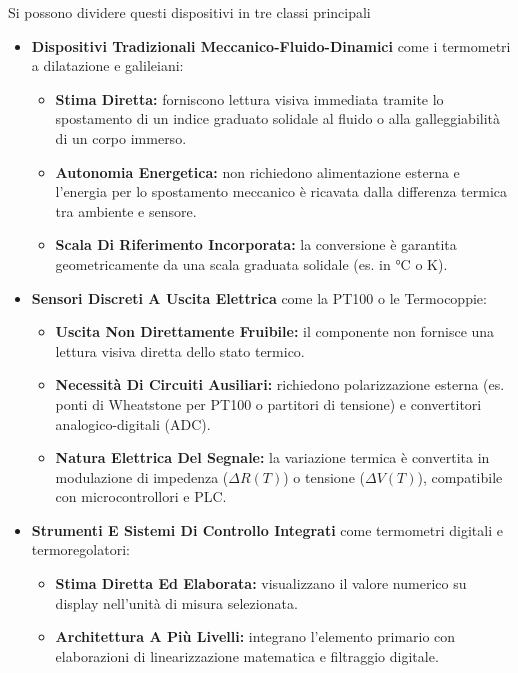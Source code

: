 ﻿\documentclass[11pt, a4paper]{article}
\begin{document}
\newpage
Si possono dividere questi dispositivi in tre classi principali
\begin{itemize}
    \item \textbf{Dispositivi Tradizionali Meccanico-Fluido-Dinamici} come i termometri a dilatazione e galileiani:
    \begin{itemize}
        \item \textbf{Stima Diretta:} forniscono lettura visiva immediata tramite lo spostamento di un indice graduato solidale al fluido o alla galleggiabilità di un corpo immerso.
        \item \textbf{Autonomia Energetica:} non richiedono alimentazione esterna e l'energia per lo spostamento meccanico è ricavata dalla differenza termica tra ambiente e sensore.
        \item \textbf{Scala Di Riferimento Incorporata:} la conversione è garantita geometricamente da una scala graduata solidale (es. in $\si{\celsius}$ o $\si{\kelvin}$).
    \end{itemize}
    \item \textbf{Sensori Discreti A Uscita Elettrica} come la PT100 o le Termocoppie:
    \begin{itemize}
        \item \textbf{Uscita Non Direttamente Fruibile:} il componente non fornisce una lettura visiva diretta dello stato termico.
        \item \textbf{Necessità Di Circuiti Ausiliari:} richiedono polarizzazione esterna (es. ponti di Wheatstone per PT100 o partitori di tensione) e convertitori analogico-digitali (ADC).
        \item \textbf{Natura Elettrica Del Segnale:} la variazione termica è convertita in modulazione di impedenza ($\Delta R(T)$) o tensione ($\Delta V(T)$), compatibile con microcontrollori e PLC.
    \end{itemize}
    \item \textbf{Strumenti E Sistemi Di Controllo Integrati} come termometri digitali e termoregolatori:
    \begin{itemize}
        \item \textbf{Stima Diretta Ed Elaborata:} visualizzano il valore numerico su display nell'unità di misura selezionata.
        \item \textbf{Architettura A Più Livelli:} integrano l'elemento primario con elaborazioni di linearizzazione matematica e filtraggio digitale.
    \end{itemize}
\end{itemize}
\end{document}
